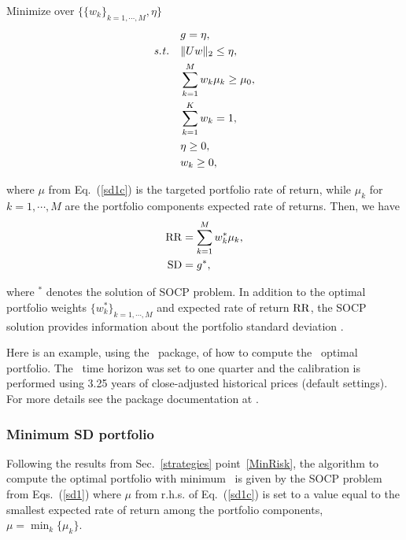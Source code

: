 \bigskip
\noindent Minimize over $\{ \{w_k\}_{k=1,\cdots,M}, \eta \}$
\begin{subequations}\label{sd1}
\begin{align}
    & g = \eta, \label{sd1a} \\
    \st & \| U w \|_2 \leq \eta, \label{sd1b} \\
        & \sum_{k=1}^M w_k \mu_k \geq \mu_0, \label{sd1c} \\
        & \sum_{k=1}^K w_k = 1, \label{sd1d} \\
        & \eta \geq 0, \label{sd1f} \\
        & w_k \geq 0, \label{sd1e}
\end{align}
\end{subequations}

\noindent where $\mu$ from Eq.~(\ref{sd1c})
is the targeted portfolio rate of return, while $\mu_k$ for $k=1,\cdots,M$
are the portfolio components expected rate of returns.
Then, we have
\begin{subequations}\label{sd2}
\begin{align}
    \RR &= \sum_{k=1}^M w_k^* \mu_k, \label{sd2a} \\
    \SD &= g^*, \label{sd2b}
\end{align}
\end{subequations}

\noindent where $^*$ denotes the solution of SOCP problem.
In addition to the optimal portfolio weights $\{w_k^*\}_{k=1,\cdots,M}$ and expected
rate of return ${\rm RR}$, the
SOCP solution provides information about the portfolio standard deviation \SD.

\bigskip
\noindent Here is an example, using the \azapy\ package, of how to compute the \SD\ optimal portfolio.
The \SD\ time horizon was set to one quarter and the calibration is performed using 3.25 years of
close-adjusted historical prices (default settings).
For more details see the package documentation at \azapydoc.



\BackToContents


\subsubsection{Minimum SD portfolio}

Following the results from Sec.~\ref{strategies} point~\ref{MinRisk},
the algorithm to compute the optimal portfolio with minimum \SD\ is given by the SOCP problem from Eqs.~(\ref{sd1}) where
$\mu$ from r.h.s. of Eq.~(\ref{sd1c}) is set to a value equal to the smallest expected rate of
return among the portfolio components, \ie\ $\mu=\min_k\{\mu_k\}$.

